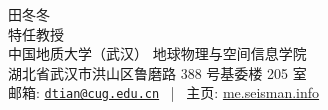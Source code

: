 \documentclass[11pt,a4paper]{article}
\makeatletter
\newcommand{\Name}{田冬冬}
\newcommand{\Role}{特任教授}
\newcommand{\Email}{dtian@cug.edu.cn}
\newcommand{\Website}{me.seisman.info}
\newcommand{\Affiliation}{中国地质大学（武汉）\hspace{1ex} 地球物理与空间信息学院}
\newcommand{\Address}{湖北省武汉市洪山区鲁磨路 388 号基委楼 205 室}
\makeatother
\begin{document}
\thispagestyle{empty} %
\begin{center}
    \kaishu
    {\fontsize{28pt}{0}\selectfont \Name}
    \\[0.5cm]
    {\fontsize{17pt}{0}\selectfont \Role}
    \\[0.3cm]
    {\fontsize{13pt}{0}\selectfont
        \Affiliation
        \\[0.2cm]
        \Address
        \\[0.08cm]
        邮箱: \href{mailto:\Email}{\texttt{\Email}}
        \, | \,
        主页: \href{https://\Website}{\Website}
    }
\end{center}












\end{document}
